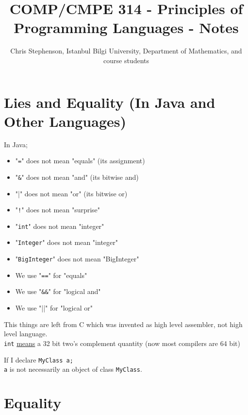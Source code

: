 \documentclass{article}
\begin{document}
\title{COMP/CMPE 314 - Principles of Programming Languages - Notes}
\author{Chris Stephenson, Istanbul Bilgi University, Department of Mathematics, and course students}
\maketitle

\section*{Lies and Equality (In Java and Other Languages)}
In Java;
\begin{itemize}
 \item "\verb|=|" does not mean "equals" (its assignment)
 \item "\verb|&|" does not mean "and" (its bitwise and)
 \item "|" does not mean "or" (its bitwise or)
 \item "\verb|!|" does not mean "surprise"
 \item "\verb|int|" does not mean "integer"
 \item "\verb|Integer|" does not mean "integer"
 \item "\verb|BigInteger|" does not mean "BigInteger"
\end{itemize}
\bigskip
\begin{itemize}
 \item We use "\verb|==|" for "equals"
 \item We use "\verb|&&|" for "logical and"
 \item We use "||" for "logical or"
\end{itemize}
\begin{flushleft}
 This things are left from C which was invented as high level assembler, not high level language.\\
 \verb|int| \underline{means} a 32 bit two's complement quantity (now most compilers are 64 bit)
\end{flushleft}
\bigskip
\begin{flushleft}
 If I declare \verb|MyClass a;|\\
 \verb|a| is not necessarily an object of class \verb|MyClass|.
\end{flushleft}
\bigskip
\section*{Equality}
\end{document}
